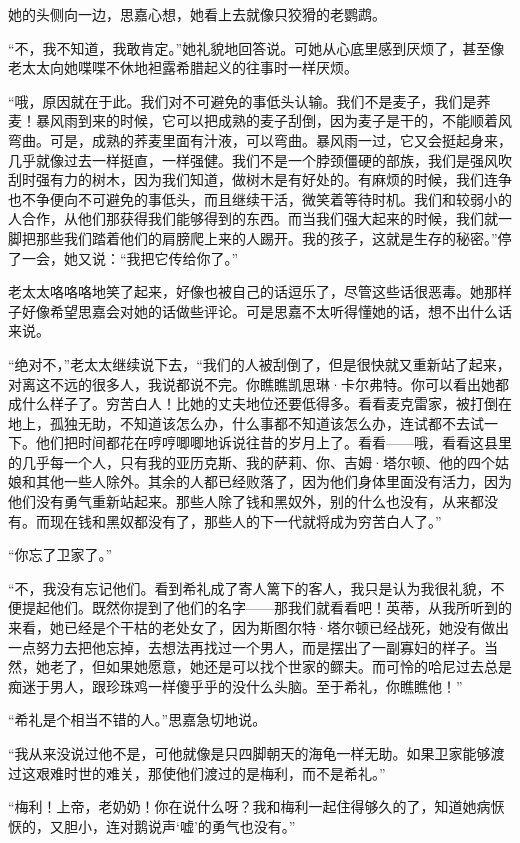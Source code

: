 \par 她的头侧向一边，思嘉心想，她看上去就像只狡猾的老鹦鹉。
\par “不，我不知道，我敢肯定。”她礼貌地回答说。可她从心底里感到厌烦了，甚至像老太太向她喋喋不休地袒露希腊起义的往事时一样厌烦。
\par “哦，原因就在于此。我们对不可避免的事低头认输。我们不是麦子，我们是荞麦！暴风雨到来的时候，它可以把成熟的麦子刮倒，因为麦子是干的，不能顺着风弯曲。可是，成熟的荞麦里面有汁液，可以弯曲。暴风雨一过，它又会挺起身来，几乎就像过去一样挺直，一样强健。我们不是一个脖颈僵硬的部族，我们是强风吹刮时强有力的树木，因为我们知道，做树木是有好处的。有麻烦的时候，我们连争也不争便向不可避免的事低头，而且继续干活，微笑着等待时机。我们和较弱小的人合作，从他们那获得我们能够得到的东西。而当我们强大起来的时候，我们就一脚把那些我们踏着他们的肩膀爬上来的人踢开。我的孩子，这就是生存的秘密。”停了一会，她又说：“我把它传给你了。”
\par 老太太咯咯咯地笑了起来，好像也被自己的话逗乐了，尽管这些话很恶毒。她那样子好像希望思嘉会对她的话做些评论。可是思嘉不太听得懂她的话，想不出什么话来说。
\par “绝对不，”老太太继续说下去，“我们的人被刮倒了，但是很快就又重新站了起来，对离这不远的很多人，我说都说不完。你瞧瞧凯思琳·卡尔弗特。你可以看出她都成什么样子了。穷苦白人！比她的丈夫地位还要低得多。看看麦克雷家，被打倒在地上，孤独无助，不知道该怎么办，什么事都不知道该怎么办，连试都不去试一下。他们把时间都花在哼哼唧唧地诉说往昔的岁月上了。看看——哦，看看这县里的几乎每一个人，只有我的亚历克斯、我的萨莉、你、吉姆·塔尔顿、他的四个姑娘和其他一些人除外。其余的人都已经败落了，因为他们身体里面没有活力，因为他们没有勇气重新站起来。那些人除了钱和黑奴外，别的什么也没有，从来都没有。而现在钱和黑奴都没有了，那些人的下一代就将成为穷苦白人了。”
\par “你忘了卫家了。”
\par “不，我没有忘记他们。看到希礼成了寄人篱下的客人，我只是认为我很礼貌，不便提起他们。既然你提到了他们的名字——那我们就看看吧！英蒂，从我所听到的来看，她已经是个干枯的老处女了，因为斯图尔特·塔尔顿已经战死，她没有做出一点努力去把他忘掉，去想法再找过一个男人，而是摆出了一副寡妇的样子。当然，她老了，但如果她愿意，她还是可以找个世家的鳏夫。而可怜的哈尼过去总是痴迷于男人，跟珍珠鸡一样傻乎乎的没什么头脑。至于希礼，你瞧瞧他！”
\par “希礼是个相当不错的人。”思嘉急切地说。
\par “我从来没说过他不是，可他就像是只四脚朝天的海龟一样无助。如果卫家能够渡过这艰难时世的难关，那使他们渡过的是梅利，而不是希礼。”
\par “梅利！上帝，老奶奶！你在说什么呀？我和梅利一起住得够久的了，知道她病恹恹的，又胆小，连对鹅说声‘嘘’的勇气也没有。”
